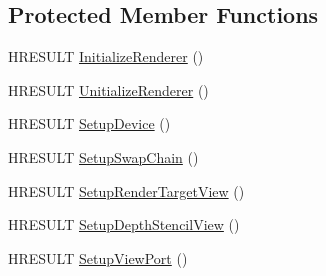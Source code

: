 \subsection*{Protected Member Functions}
\begin{DoxyCompactItemize}
\item 
H\+R\+E\+S\+U\+LT \hyperlink{classmage_1_1_renderer_aafed50e7e14ca597541c091941351929}{Initialize\+Renderer} ()
\item 
H\+R\+E\+S\+U\+LT \hyperlink{classmage_1_1_renderer_a308beaf67b11128f02e87778b6a9c3c7}{Unitialize\+Renderer} ()
\item 
H\+R\+E\+S\+U\+LT \hyperlink{classmage_1_1_renderer_a4ee0187fb63587a219798523fb8cb7a6}{Setup\+Device} ()
\item 
H\+R\+E\+S\+U\+LT \hyperlink{classmage_1_1_renderer_af2aa545594936261bf2639e4e0814a83}{Setup\+Swap\+Chain} ()
\item 
H\+R\+E\+S\+U\+LT \hyperlink{classmage_1_1_renderer_afe99715a4ae6432ba561dcab048f79b4}{Setup\+Render\+Target\+View} ()
\item 
H\+R\+E\+S\+U\+LT \hyperlink{classmage_1_1_renderer_a95a34b64e815b0e5e95ce539bbd0f5a3}{Setup\+Depth\+Stencil\+View} ()
\item 
H\+R\+E\+S\+U\+LT \hyperlink{classmage_1_1_renderer_a9bc8598ccca5f6e7cf99010175b1360b}{Setup\+View\+Port} ()
\end{DoxyCompactItemize}
